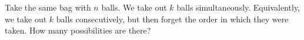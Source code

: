 

\setcounter{section}{2}
\setcounter{subsection}{4}
\setcounter{dfn}{10}

Take the same bag with $n$ balls.
We take out $k$ balls simultaneously.
Equivalently, we take out $k$ balls consecutively, but then forget the order in which they were taken.
How many possibilities are there?



